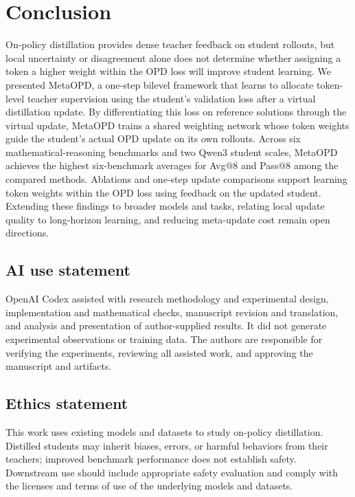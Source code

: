 \documentclass{article}
\theoremstyle{plain}
\theoremstyle{definition}
\theoremstyle{remark}
\begin{document}



\section{Conclusion}

On-policy distillation provides dense teacher feedback on student rollouts, but local uncertainty or disagreement alone does not determine whether assigning a token a higher weight within the OPD loss will improve student learning. 
We presented MetaOPD, a one-step bilevel framework that learns to allocate token-level teacher supervision using the student's validation loss after a virtual distillation update. By differentiating this loss on reference solutions through the virtual update, MetaOPD trains a shared weighting network whose token weights guide the student's actual OPD update on its own rollouts.
Across six mathematical-reasoning benchmarks and two Qwen3 student scales, MetaOPD achieves the highest six-benchmark averages for Avg@8 and Pass@8 among the compared methods. Ablations and one-step update comparisons support learning token weights within the OPD loss using feedback on the updated student. Extending these findings to broader models and tasks, relating local update quality to long-horizon learning, and reducing meta-update cost remain open directions.


\subsection*{AI use statement}
OpenAI Codex assisted with research methodology and experimental design, implementation and mathematical checks, manuscript revision and translation, and analysis and presentation of author-supplied results. It did not generate experimental observations or training data. The authors are responsible for verifying the experiments, reviewing all assisted work, and approving the manuscript and artifacts.


\subsection*{Ethics statement}
This work uses existing models and datasets to study on-policy distillation. Distilled students may inherit biases, errors, or harmful behaviors from their teachers; improved benchmark performance does not establish safety. Downstream use should include appropriate safety evaluation and comply with the licenses and terms of use of the underlying models and datasets.
\end{document}
